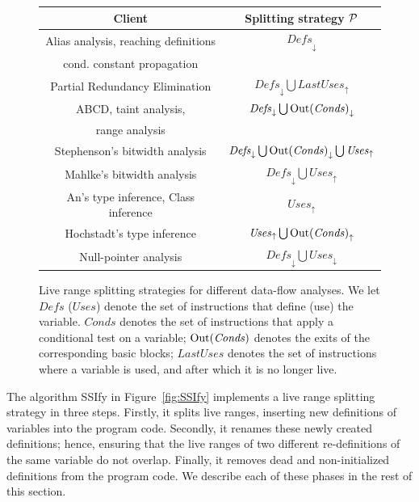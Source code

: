 \begin{figure}[t!]
\begin{center}
\begin{small}
\renewcommand\arraystretch{1.4}
\begin{tabular}{| c | c |} \hline
{\bf Client} & {\bf Splitting strategy ${\cal P}$} \\ \hline 
Alias analysis, reaching definitions & $\mathit{Defs}_\downarrow$ \\ 
cond. constant propagation &  \\ \hline  
Partial Redundancy Elimination & $\mathit{Defs}_\downarrow \bigcup \mathit{LastUses}_\uparrow$ \\ \hline 
ABCD, taint analysis,  & $\mathit{Defs}_\downarrow \bigcup \mathit{\mathrm{Out}(Conds)}_\downarrow$ \\ 
range analysis & \\ \hline 
Stephenson's bitwidth analysis & $\mathit{Defs}_\downarrow \bigcup \mathit{\mathrm{Out}(Conds)}_\downarrow \bigcup \mathit{Uses}_\uparrow$  \\ \hline 
Mahlke's bitwidth analysis & $\mathit{Defs}_\downarrow \bigcup \mathit{Uses}_\uparrow$  \\ \hline 
An's type inference, Class inference & $\mathit{Uses}_\uparrow$ \\ \hline 
Hochstadt's type inference & $\mathit{Uses}_\uparrow \bigcup \mathit{\mathrm{Out}(Conds)}_\uparrow$ \\ \hline 
Null-pointer analysis & $\mathit{Defs}_\downarrow \bigcup\mathit{Uses}_\downarrow$ \\ \hline
\end{tabular} \end{small} 
\caption{Live range splitting strategies for different data-flow analyses.
We let $\mathit{Defs}$ ($\mathit{Uses}$) denote the set of instructions that define (use) the variable. $\mathit{Conds}$ denotes the set of instructions that apply a conditional test on a variable; $\mathrm{Out}(\mathit{Conds})$ denotes the exits of the corresponding basic blocks; $\mathit{LastUses}$ denotes the set of instructions where a variable is used, and after which it is no longer live.}
\label{fig:splittingSt} \end{center} \end{figure}

\def\SSIfy{\textsf{SSIfy}}

The algorithm \textsf{\SSIfy} in Figure~\ref{fig:SSIfy} implements a
live range splitting strategy in three steps.
Firstly, it splits live ranges, inserting new definitions of variables into the
program code.
Secondly, it renames these newly created definitions; hence, ensuring that
the live ranges of two different re-definitions of the same variable do not
overlap.
Finally, it removes dead and non-initialized definitions from the program code.
We describe each of these phases in the rest of this section.

